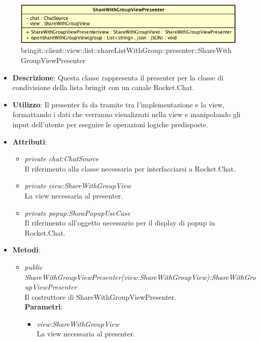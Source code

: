 \label{bringit::client::view::list::shareListWithGroup::presenter::ShareWithGroupViewPresenter}
\begin{figure}[H]
	\centering
	\includegraphics[scale=0.5]{Sezioni/SottosezioniST/img/app/ShareWithGroupViewPresenter.png}
	\caption{bringit::client::view::list::shareListWithGroup::presenter::ShareWithGroupViewPresenter}
\end{figure}

\begin{itemize}
\item \textbf{Descrizione}: Questa classe rappresenta il presenter per la classe di condivisione della lista bringit con un canale Rocket.Chat.
\item \textbf{Utilizzo}: Il presenter fa da tramite tra l'implementazione e la view, formattando i dati che verranno visualizzati nella view e manipolando gli input dell'utente per eseguire le operazioni logiche predisposte.
\item \textbf{Attributi}: 
	\begin{itemize}
	\item \textit{private chat:ChatSource}\\
	Il riferimento alla classe necessaria per interfacciarsi a Rocket.Chat.
	\item \textit{private view:ShareWithGroupView}\\
	La view necessaria al presenter.
	\item \textit{private popup:ShowPopupUseCase}\\
	Il riferimento all'oggetto necessario per il display di popup in Rocket.Chat.
	\end{itemize}
\item \textbf{Metodi}:
	\begin{itemize}
	\item \textit{public ShareWithGroupViewPresenter(view:ShareWithGroupView):ShareWithGroupViewPresenter}\\
	Il costruttore di ShareWithGroupViewPresenter.
					\\ \textbf{Parametri}: \begin{itemize}
			\item \textit{view:ShareWithGroupView}\\
			La view necessaria al presenter.

\end{itemize}
\end{itemize}
\end{itemize}
